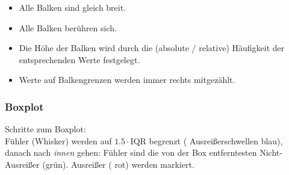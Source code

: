 \begin{multicols}{2}
\begin{itemize}
\item Alle Balken sind gleich breit.
\item Alle Balken berühren sich.
\item Die Höhe der Balken wird durch die (absolute / relative) Häufigkeit der entsprechenden
Werte festgelegt.
\item Werte auf Balkengrenzen werden immer rechts mitgezählt.
\end{itemize}



\end{multicols}

\subsubsection*{Boxplot}
Schritte zum Boxplot:\\
Fühler (Whisker) werden auf $1.5\cdot\textrm{IQR}$ begrenzt ({\color{blue} Ausreißerschwellen blau}),
danach nach \textit{\color{ForestGreen}innen} gehen: Fühler sind die von der Box
entferntesten Nicht-Ausreißer ({\color{ForestGreen}grün}). Ausreißer
({\color{red} rot}) werden markiert.

